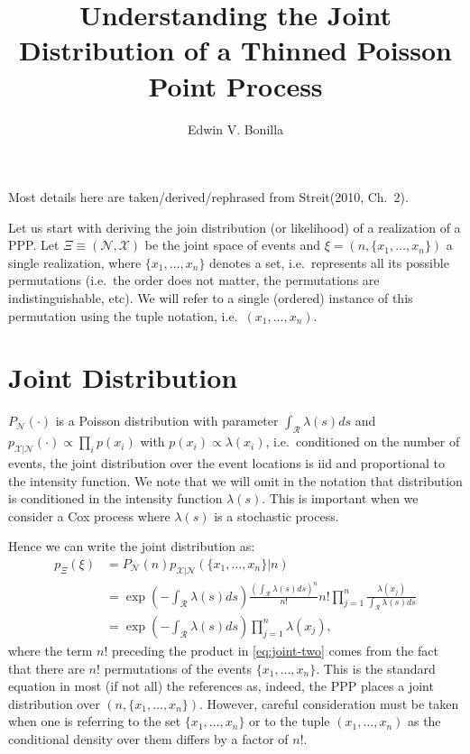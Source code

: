 \documentclass{article}
\title{Understanding the Joint Distribution of a Thinned Poisson Point Process}
\author{Edwin V. Bonilla}
\newcommand{\calR}{\mathcal{R}}
\newcommand{\ls}{\lambda(s)}
\begin{document}
	\maketitle
	Most details here are taken/derived/rephrased from Streit(2010, Ch.~2). 
	
	Let us start with deriving the join distribution (or likelihood) of a realization of a \gls{PPP}. Let $\Xi \equiv (\mathcal{N}, \mathcal{X})$  be the joint space of events and $\xi = (n, \{x_1, \ldots, x_n\})$ a single realization, where $\{x_1, \ldots, x_n \}$ denotes a set, i.e.~represents all its possible permutations (i.e.~the order does not matter, the permutations are indistinguishable, etc). We will refer to a single (ordered) instance of this permutation using the tuple notation, i.e.~$(x_1, \ldots, x_n)$.
	
	\section{Joint Distribution}
	
	$P_{\mathcal{N}}(\cdot)$ is a Poisson distribution with parameter $\int_{\calR} \ls ds$ and $p_{\mathcal{X} | \mathcal{N}} (\cdot) \propto \prod_{i} p(x_i)$ with $p(x_i) \propto   \lambda(x_i)$, i.e.~conditioned on the number of events, the joint distribution over the event locations is iid and proportional to the intensity function. We note that we will omit in the notation that distribution is conditioned in the intensity function $\ls$. This is important when we consider a Cox process where $\ls$ is a stochastic process. 
	  
	Hence we can write the joint distribution as:
	\begin{align}
	p_{\Xi}(\xi) &= P_{\mathcal{N}}(n) p_{\mathcal{X} | \mathcal{N}}(\{x_1, \ldots, x_n \} | n )\\
	\label{eq:joint-two}
	&= \exp\left(-\int_{\calR} \ls ds\right) \frac{\left(\int_{\calR} \ls ds \right)^{n}}{n!} n! \prod_{j=1}^{n}  \frac{\lambda(x_j)}{\int_{\calR} \lambda(s) ds} \\
	\label{eq:joint-three}
	&= \exp\left(-\int_{\calR} \ls ds\right) \prod_{j=1}^{n}  {\lambda(x_j)} \text{,}
	\end{align}
	where the term $n!$ preceding the product in \cref{eq:joint-two} comes from the fact that there are $n!$ permutations of the events $\{x_1, \ldots, x_n\}$. 
	This is the standard equation in most (if not all) the references as, indeed, the \gls{PPP} places a joint distribution over $(n, \{x_1, \ldots, x_n\})$. However, careful consideration must be taken when one is referring to the set $\{x_1, \ldots, x_n\}$ or to the tuple $(x_1, \ldots, x_n)$ as the conditional density over them differs by a factor of  $n!$.  
\end{document}
